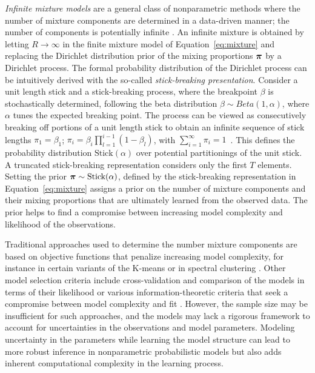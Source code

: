 {\it Infinite mixture models} are a general class of nonparametric
methods where the number of mixture components are determined in a
data-driven manner; the number of components is potentially infinite
\citep[see e.g.][]{Muller2004, Rasmussen00}. An infinite mixture is
obtained by letting \(R \rightarrow \infty\) in the finite mixture
model of Equation~\ref{eq:mixture} and replacing the Dirichlet
distribution prior of the mixing proportions \({\boldsymbol \pi}\) by a Dirichlet
process. The formal probability distribution of the Dirichlet process
can be intuitively derived with the so-called {\it stick-breaking
presentation}.  Consider a unit length stick and a stick-breaking
process, where the breakpoint \(\beta\) is stochastically determined,
following the beta distribution $\beta \sim Beta(1, \alpha)$, where
\(\alpha\) tunes the expected breaking point. The process can be
viewed as consecutively breaking off portions of a unit length stick
to obtain an infinite sequence of stick lengths \(\pi_1 = \beta_1\);
\(\pi_i = \beta_i \prod_{l=1}^{i-1} (1-\beta_l)\), with
$\sum_{i=1}^\infty \pi_i = 1$~\citep{Ishwaran01}.  This defines the
probability distribution \(\text{Stick}(\alpha)\) over potential
partitionings of the unit stick. A truncated stick-breaking
representation considers only the first $T$ elements. Setting the
prior \({\boldsymbol \pi} \sim \text{Stick}(\alpha)\), defined by the
stick-breaking representation in Equation~\ref{eq:mixture} assigns a
prior on the number of mixture components and their mixing proportions
that are ultimately learned from the observed data. The prior helps to
find a compromise between increasing model complexity and likelihood
of the observations.

Traditional approaches used to determine the number mixture components
are based on objective functions that penalize increasing model
complexity, for instance in certain variants of the K-means or in
spectral clustering \citep[see e.g.][]{Hastie09}. Other model
selection criteria include cross-validation and comparison of the
models in terms of their likelihood or various information-theoretic
criteria that seek a compromise between model complexity and fit
\citep[see e.g.][]{Gelman03}. However, the sample size may be
insufficient for such approaches, and the models may lack a rigorous
framework to account for uncertainties in the observations and model
parameters. Modeling uncertainty in the parameters while learning the
model structure can lead to more robust inference in nonparametric
probabilistic models but also adds inherent computational complexity
in the learning process.

